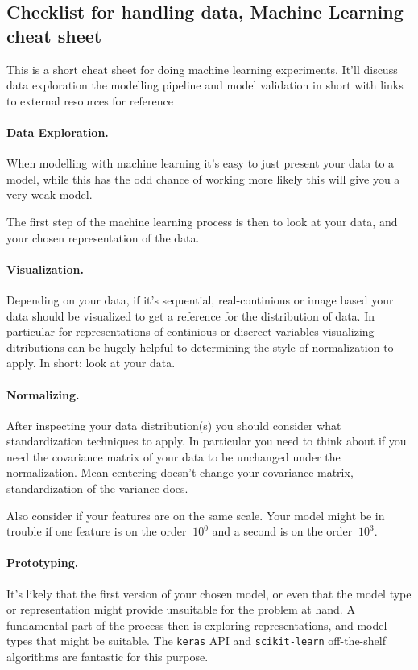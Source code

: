 \documentclass[%
oneside,                 %
final,                   %
10pt]{article}
\begin{document}
\subsection{Checklist for handling data, Machine Learning cheat sheet}


This is a short cheat sheet for doing machine learning
experiments. It'll discuss data exploration the modelling pipeline and
model validation in short with links to external resources for
reference

\paragraph{Data Exploration.}
When modelling with machine learning it's easy to just present your
data to a model, while this has the odd chance of working more likely
this will give you a very weak model.

The first step of the machine learning process is then to look at your
data, and your chosen representation of the data.

\paragraph{Visualization.}
Depending on your data, if it's sequential, real-continious or image
based your data should be visualized to get a reference for the
distribution of data. In particular for representations of continious
or discreet variables visualizing ditributions can be hugely helpful
to determining the style of normalization to apply. In short: look at
your data.

\paragraph{Normalizing.}
After inspecting your data distribution(s) you should consider what
standardization techniques to apply. In particular you need to think
about if you need the covariance matrix of your data to be unchanged
under the normalization. Mean centering doesn't change your covariance
matrix, standardization of the variance does.

Also consider if your features are on the same scale. Your model might
be in trouble if one feature is on the order $~10^0$ and a second is
on the order $~10^3$.


\paragraph{Prototyping.}
It's likely that the first version of your chosen model, or even that
the model type or representation might provide unsuitable for the
problem at hand. A fundamental part of the process then is exploring
representations, and model types that might be suitable. The \texttt{keras}
API and \texttt{scikit-learn} off-the-shelf algorithms are fantastic for this
purpose.
\end{document}
